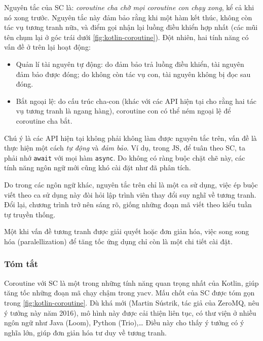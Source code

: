 \documentclass[../../thesis]{subfiles}
\begin{document}
Nguyên tắc của SC là: \emph{coroutine cha chờ mọi coroutine con chạy xong}, kể
cả khi nó xong trước. Nguyên tắc này đảm bảo rằng khi một hàm kết thúc, không
còn tác vụ tương tranh nữa, và điểm gọi nhận lại luồng điều khiển hợp nhất (các
mũi tên chụm lại ở góc trái dưới \autoref{fig:kotlin-coroutine}). Đột nhiên, hai
tính năng có vấn đề ở trên lại hoạt động:

\begin{itemize}
    \item
        Quản lí tài nguyên tự động: do đảm bảo trả luồng điều khiển, tài nguyên
        đảm bảo được đóng; do không còn tác vụ con, tài nguyên không bị đọc sau
        đóng.
\end{itemize}

\begin{itemize}[resume, before = \vspace*{-\dimexpr\topsep+\partopsep\relax}]
    \item
        Bắt ngoại lệ: do cấu trúc cha-con (khác với các API hiện tại cho rằng
        hai tác vụ tương tranh là ngang hàng), coroutine con có thể ném ngoại lệ
        để coroutine cha bắt.
\end{itemize}

Chú ý là các API hiện tại không phải không làm được nguyên tắc trên, vấn đề là
thực hiện một cách \emph{tự động} và \emph{đảm bảo}. Ví dụ, trong JS, để tuân
theo SC, ta phải nhớ \texttt{await} với mọi hàm \texttt{async}. Do không có ràng
buộc chặt chẽ này, các tính năng ngôn ngữ mới cũng khó cài đặt như đã phân tích.

Do trong các ngôn ngữ khác, nguyên tắc trên chỉ là một ca sử dụng, việc ép buộc
viết theo ca sử dụng này đòi hỏi lập trình viên thay đổi suy nghĩ về tương
tranh. Đổi lại, chương trình trở nên sáng rõ, giống những đoạn mã viết theo kiểu
tuần tự truyền thống.

Một khi vấn đề tương tranh được giải quyết hoặc đơn giản hóa, việc song song hóa
(paralellization) để tăng tốc ứng dụng chỉ còn là một chi tiết cài đặt.

\subsubsection{Tóm tắt}

Coroutine với SC là một trong những tính năng quan trọng nhất của Kotlin, giúp
tăng tốc những đoạn mã chạy chậm trong yacv. Mấu chốt của SC được tóm gọn trong
\autoref{fig:kotlin-coroutine}. Dù khá mới (Martin Sústrik, tác giả của ZeroMQ,
nêu ý tưởng này năm 2016), mô hình này được cải thiện liên tục, có thư viện ở
nhiều ngôn ngữ như Java (Loom), Python (Trio),\ldots{} Điều này cho thấy ý tưởng
có ý nghĩa lớn, giúp đơn giản hóa tư duy về tương tranh.
\end{document}

